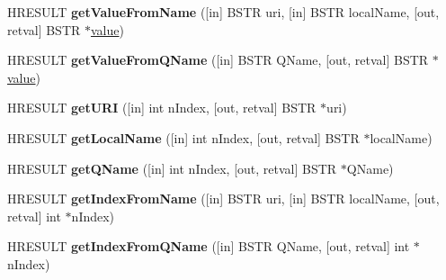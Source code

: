\begin{DoxyCompactItemize}
H\+R\+E\+S\+U\+LT {\bfseries get\+Value\+From\+Name} (\mbox{[}in\mbox{]} B\+S\+TR uri, \mbox{[}in\mbox{]} B\+S\+TR local\+Name, \mbox{[}out, retval\mbox{]} B\+S\+TR $\ast$\hyperlink{unionvalue}{value})
\item 
\mbox{\label{interface_m_s_x_m_l2_1_1_i_v_b_s_a_x_attributes_a5d12838d49c43aa60cdfb945c32debea}} 
H\+R\+E\+S\+U\+LT {\bfseries get\+Value\+From\+Q\+Name} (\mbox{[}in\mbox{]} B\+S\+TR Q\+Name, \mbox{[}out, retval\mbox{]} B\+S\+TR $\ast$\hyperlink{unionvalue}{value})
\item 
\mbox{\label{interface_m_s_x_m_l2_1_1_i_v_b_s_a_x_attributes_a32838b56e0368596f816f4c2cfbaa8dd}} 
H\+R\+E\+S\+U\+LT {\bfseries get\+U\+RI} (\mbox{[}in\mbox{]} int n\+Index, \mbox{[}out, retval\mbox{]} B\+S\+TR $\ast$uri)
\item 
\mbox{\label{interface_m_s_x_m_l2_1_1_i_v_b_s_a_x_attributes_a47c76aac29b5ec0dfe0ec9c0a2dd35c8}} 
H\+R\+E\+S\+U\+LT {\bfseries get\+Local\+Name} (\mbox{[}in\mbox{]} int n\+Index, \mbox{[}out, retval\mbox{]} B\+S\+TR $\ast$local\+Name)
\item 
\mbox{\label{interface_m_s_x_m_l2_1_1_i_v_b_s_a_x_attributes_a3ceb46d592ed3e6ab8c209bfff90b08b}} 
H\+R\+E\+S\+U\+LT {\bfseries get\+Q\+Name} (\mbox{[}in\mbox{]} int n\+Index, \mbox{[}out, retval\mbox{]} B\+S\+TR $\ast$Q\+Name)
\item 
\mbox{\label{interface_m_s_x_m_l2_1_1_i_v_b_s_a_x_attributes_abcb7a54c72c73fd2cb65f8293b16796e}} 
H\+R\+E\+S\+U\+LT {\bfseries get\+Index\+From\+Name} (\mbox{[}in\mbox{]} B\+S\+TR uri, \mbox{[}in\mbox{]} B\+S\+TR local\+Name, \mbox{[}out, retval\mbox{]} int $\ast$n\+Index)
\item 
\mbox{\label{interface_m_s_x_m_l2_1_1_i_v_b_s_a_x_attributes_a5030eea26c73f90737afb63cd8a9d065}} 
H\+R\+E\+S\+U\+LT {\bfseries get\+Index\+From\+Q\+Name} (\mbox{[}in\mbox{]} B\+S\+TR Q\+Name, \mbox{[}out, retval\mbox{]} int $\ast$n\+Index)
\item 
\mbox{\label{interface_m_s_x_m_l2_1_1_i_v_b_s_a_x_attributes_a663ceda14498d9e8e26be3ebdd4a07dd}} 

\end{DoxyCompactItemize}
